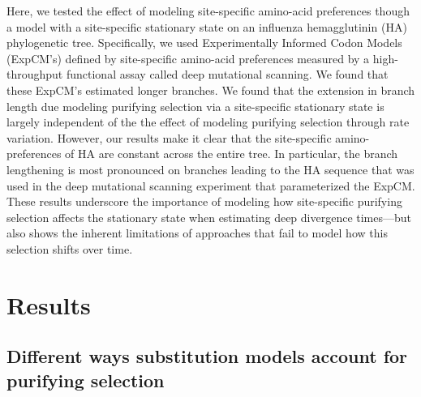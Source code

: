 \documentclass[11pt]{article}
\begin{document}
Here, we tested the effect of modeling site-specific amino-acid preferences though a model with a site-specific stationary state on an influenza hemagglutinin (HA) phylogenetic tree. 
Specifically, we used Experimentally Informed Codon Models (ExpCM's) defined by site-specific amino-acid preferences measured by a high-throughput functional assay called deep mutational scanning. 
We found that these ExpCM's estimated longer branches. 
We found that the extension in branch length due modeling purifying selection via a site-specific stationary state is largely independent of the the effect of modeling purifying selection through rate variation. 
However, our results make it clear that the site-specific amino-preferences of HA are constant across the entire tree. 
In particular, the branch lengthening is most pronounced on branches leading to the HA sequence that was used in the deep mutational scanning experiment that parameterized the ExpCM.
These results underscore the importance of modeling how site-specific purifying selection affects the stationary state when estimating deep divergence times---but also shows the inherent limitations of approaches that fail to model how this selection shifts over time. 


\section*{Results}

\subsection*{Different ways substitution models account for purifying selection}
\end{document}
